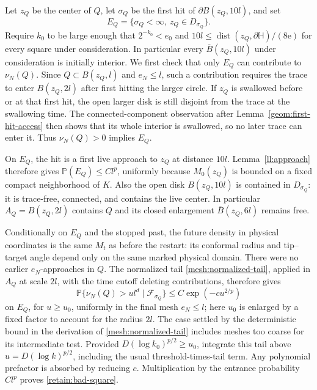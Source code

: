 \documentclass[11pt]{article}
\theoremstyle{definition}
\theoremstyle{remark}
\numberwithin{equation}{section}
\begin{document}
Let $z_Q$ be the center of $Q$, let $\sigma_Q$ be the first hit of
$\partial B(z_Q,10l)$, and set
\[
 E_Q=\{\sigma_Q<\infty,\ z_Q\in D_{\sigma_Q}\}.
\]
Require $k_0$ to be large enough that $2^{-k_0}<e_0$ and
$10l\le\operatorname{dist}(z_Q,\partial\mathbb H)/(8\mathrm e)$
for every square under consideration.  In particular every
$\overline B(z_Q,10l)$ under consideration is initially interior.
We first check that only $E_Q$ can contribute to $\nu_N(Q)$.
Since $Q\subset B(z_Q,l)$ and $e_N\le l$, such a contribution requires
the trace to enter $B(z_Q,2l)$ after first hitting the larger circle.
If $z_Q$ is swallowed before or at that first hit, the open larger
disk is still disjoint from the trace at the swallowing time.  The
connected-component observation after Lemma~\ref{geom:first-hit-access}
then shows that its whole interior is swallowed, so no later trace
can enter it.
Thus $\nu_N(Q)>0$ implies $E_Q$.

On $E_Q$, the hit is a first live approach to $z_Q$ at distance $10l$.
Lemma~\ref{ll:approach} therefore gives
$\mathbb P(E_Q)\le Cl^p$, uniformly because $M_0(z_Q)$ is bounded on
a fixed compact neighborhood of $K$.  Also the open disk
$B(z_Q,10l)$ is contained in $D_{\sigma_Q}$: it is trace-free,
connected, and contains the live center.  In particular
$A_Q=B(z_Q,2l)$ contains $Q$ and its closed enlargement
$\overline B(z_Q,6l)$ remains free.

Conditionally on $E_Q$ and the stopped past, the future density in
physical coordinates is the same $M_t$ as before the restart: its
conformal radius and tip--target angle depend only on the same marked
physical domain.  There were no earlier $e_N$-approaches in
$Q$.  The normalized tail \eqref{mesh:normalized-tail}, applied in
$A_Q$ at scale $2l$, with the time cutoff deleting contributions,
therefore gives
\[
 \mathbb P\{\nu_N(Q)>u l^d\mid\mathcal F_{\sigma_Q}\}
 \le C\exp(-cu^{2/p})
\]
on $E_Q$, for $u\ge u_0$, uniformly in the final mesh $e_N\le l$;
here $u_0$ is enlarged by a fixed factor to account for the radius $2l$.
The case settled by the deterministic bound in the derivation of
\eqref{mesh:normalized-tail} includes meshes too coarse for its
intermediate test.  Provided $D(\log k_0)^{p/2}\ge u_0$, integrate
this tail above
$u=D(\log k)^{p/2}$, including the usual threshold-times-tail term.
Any polynomial prefactor is absorbed by reducing $c$.  Multiplication
by the entrance probability $Cl^p$ proves
\eqref{retain:bad-square}.
\end{document}
